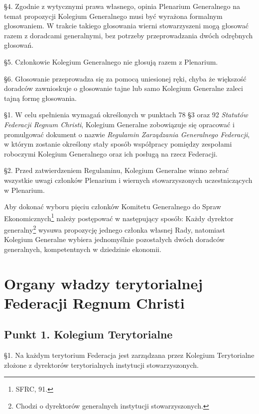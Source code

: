 \S{}4. Zgodnie z wytycznymi prawa własnego, opinia Plenarium Generalnego na temat propozycji Kolegium Generalnego musi być wyrażona formalnym głosowaniem. W trakcie takiego głosowania wierni stowarzyszeni mogą głosować razem z doradcami generalnymi, bez potrzeby przeprowadzania dwóch odrębnych głosowań.

\S{}5. Członkowie Kolegium Generalnego nie głosują razem z Plenarium.

\S{}6. Głosowanie przeprowadza się za pomocą uniesionej ręki, chyba że większość doradców zawnioskuje o głosowanie tajne lub samo Kolegium Generalne zaleci tajną formę głosowania.


\S{}1. W celu spełnienia wymagań określonych w punktach 78 \S{}3 oraz 92 {\em Statutów Federacji Regnum Christi}, Kolegium Generalne zobowiązuje się opracować i promulgować dokument o nazwie {\em Regulamin Zarządzania Generalnego Federacji}, w którym zostanie określony stały sposób współpracy pomiędzy zespołami roboczymi Kolegium Generalnego oraz ich posługą na rzecz Federacji.

\S{}2. Przed zatwierdzeniem Regulaminu, Kolegium Generalne winno zebrać wszystkie uwagi członków Plenarium i wiernych stowarzyszonych uczestniczących w Plenarium.


 Aby dokonać wyboru pięciu członków Komitetu Generalnego do Spraw Ekonomicznych\footnote{SFRC, 91.} należy postępować w następujący sposób: Każdy dyrektor generalny\footnote{Chodzi o dyrektorów generalnych instytucji stowarzyszonych.} wysuwa propozycję jednego członka własnej Rady, natomiast Kolegium Generalne wybiera jednomyślnie pozostałych dwóch doradców generalnych, kompetentnych w dziedzinie ekonomii.

\chapter{Organy władzy terytorialnej Federacji Regnum Christi}


\section{Punkt 1. Kolegium Terytorialne}


 \S{}1. Na każdym terytorium Federacja jest zarządzana przez Kolegium Terytorialne złożone z dyrektorów terytorialnych instytucji stowarzyszonych.


